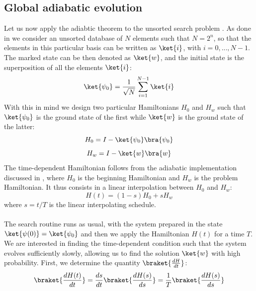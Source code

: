     \subsection{Global adiabatic evolution}\label{subsec:global adiabatic}
    Let us now apply the adiabtic theorem to the unsorted search problem \cite{Roland2002}. As done in  we consider an unsorted database of $N$ elements such that $N=2^n$, so that the elements in this particular basis can be written as $\ket{i}$, with $i=0,...,N-1$. The marked state can be then denoted as $\ket{w}$, and the initial state is the superposition of all the elements $\ket{i}$:
    \begin{equation}
      \ket{\psi_0}=\frac{1}{\sqrt{N}}\sum_{i=1}^{N-1}\ket{i}
    \end{equation}
    With this in mind we design two particular Hamiltonians $H_0$ and $H_w$ such that $\ket{\psi_0}$ is the ground state of the first while $\ket{w}$ is the ground state of the latter:
    \begin{equation}
      H_0 = I- \ket{\psi_0}\bra{\psi_0}
      \label{eq:adiabatic_ground}
    \end{equation}
    \vspace{-1cm}
    \begin{equation}
      H_w = I- \ket{w}\bra{w}
      \label{eq:adiabatic_first}
    \end{equation}
    The time-dependent Hamiltonian follows from the adiabatic implementation discussed in , where $H_0$ is the beginning Hamiltonian and $H_w$ is the problem Hamiltonian. It thus consists in a linear interpolation between $H_0$ and $H_w$:
    \begin{equation}
      H(t) = (1-s)H_0 + sH_w
    \end{equation}
    where $s=t/T$ is the linear interpolating schedule.\\ \\
    The search routine runs as usual, with the system prepared in the state $\ket{\psi(0)}=\ket{\psi_0}$ and then we apply the Hamiltonian $H(t)$ for a time $T$. We are interested in finding the time-dependent condition such that the system evolves sufficiently slowly, allowing us to find the solution $\ket{w}$ with high probability. First, we determine the quantity $\braket{\frac{dH}{dt}}$:
    \begin{equation}
      \braket{\frac{dH(t)}{dt}} = \frac{ds}{dt}\braket{\frac{dH(s)}{ds}} = \frac{1}{T}\braket{\frac{dH(s)}{ds}}
    \end{equation}
